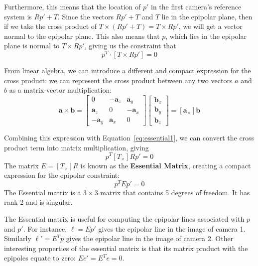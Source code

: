 \documentclass[a4paper, 12pt]{article}
\renewcommand\emph{\textbf}
\begin{document}
Furthermore, this means that the location of $p'$ in the first camera's reference system is $Rp' + T$. Since the vectors $Rp'+T$ and $T$ lie in the epipolar plane, then if we take the cross product of $T\times(Rp' + T) = T \times Rp'$, we will get a vector normal to the epipolar plane. This also means that $p$, which lies in the epipolar plane is normal to $T\times Rp'$, giving us the constraint that 
\begin{equation}
    p^T \cdot [T\times Rp']  = 0
    \label{eq:essential1}
\end{equation}

From linear algebra, we can introduce a different and compact expression for the cross product: we can represent the cross product between any two vectors $a$ and $b$ as a matrix-vector multiplication:
\begin{equation}
    \mathbf{a}\times \mathbf{b} = \begin{bmatrix} 0 & -\mathbf{a}_z & \mathbf{a}_y \\ \mathbf{a}_z & 0 & -\mathbf{a}_x \\ -\mathbf{a}_y & \mathbf{a}_x & 0\end{bmatrix}\begin{bmatrix} \mathbf{b}_x \\ \mathbf{b}_y \\ \mathbf{b}_z\end{bmatrix} = [\mathbf{a}_\times] \mathbf{b}
\end{equation}

Combining this expression with Equation~\ref{eq:essential1}, we can convert the cross product term into matrix multiplication, giving
\begin{equation}
    p^T[T_\times]Rp' = 0
\end{equation}
The matrix $E = [T_\times]R$ is known as the \emph{Essential Matrix}, creating a compact expression for the epipolar constraint: 
\begin{equation}
    p^T E p' = 0
\end{equation}
The Essential matrix is a $3\times3$ matrix that contains 5 degrees of freedom. It has rank 2 and is singular. 

The Essential matrix is useful for computing the epipolar lines associated with $p$ and $p'$. For instance, $\ell = Ep'$ gives the epipolar line in the image of camera 1. Similarly $\ell' = E^Tp$ gives the epipolar line in the image of camera 2. Other interesting properties of the essential matrix is that its matrix product with the epipoles equate to zero: $Ee' = E^Te = 0$. 
\end{document}
